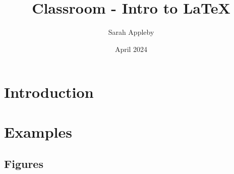 \documentclass[a4paper, 12pt]{article}
\title{Classroom - Intro to LaTeX}
\author{Sarah Appleby}
\date{April 2024}
\begin{document}
\maketitle

\tableofcontents 

\section{Introduction}





\section{Examples}


\subsection{Figures}



\end{document}
